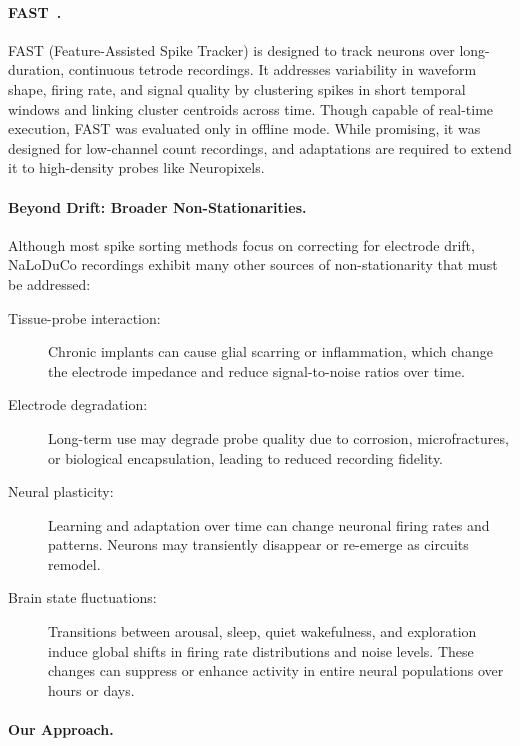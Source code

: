 \paragraph{FAST~\citep{dhawaleEtAl17}.}  
FAST (Feature-Assisted Spike Tracker) is designed to track neurons over
long-duration, continuous tetrode recordings. It addresses variability in
waveform shape, firing rate, and signal quality by clustering spikes in short
temporal windows and linking cluster centroids across time. Though capable of
real-time execution, FAST was evaluated only in offline mode. While promising,
it was designed for low-channel count recordings, and adaptations are required
to extend it to high-density probes like Neuropixels.

\paragraph{Beyond Drift: Broader Non-Stationarities.}  
Although most spike sorting methods focus on correcting for electrode drift,
NaLoDuCo recordings exhibit many other sources of non-stationarity that must be
addressed:

\begin{description}

	\item[Tissue-probe interaction:] Chronic implants can cause glial scarring
or inflammation, which change the electrode impedance and reduce
signal-to-noise ratios over time.

	\item[Electrode degradation:] Long-term use may degrade probe quality due
to corrosion, microfractures, or biological encapsulation, leading to reduced
recording fidelity.

	\item[Neural plasticity:] Learning and adaptation over time can change
neuronal firing rates and patterns. Neurons may transiently disappear or
re-emerge as circuits remodel.

	\item[Brain state fluctuations:] Transitions between arousal, sleep, quiet
wakefulness, and exploration induce global shifts in firing rate distributions
and noise levels. These changes can suppress or enhance activity in entire
neural populations over hours or days.

\end{description}

\paragraph{Our Approach.}  

